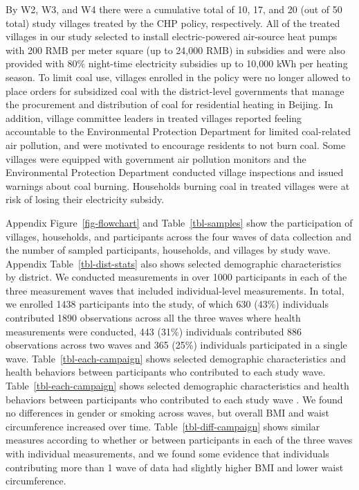 \documentclass[
  letterpaper,
  DIV=11,
  numbers=noendperiod]{scrartcl}
\begin{document}
By W2, W3, and W4 there were a cumulative total of 10, 17, and 20 (out
of 50 total) study villages treated by the CHP policy, respectively. All
of the treated villages in our study selected to install
electric-powered air-source heat pumps with 200 RMB per meter square (up
to 24,000 RMB) in subsidies and were also provided with 80\% night-time
electricity subsidies up to 10,000 kWh per heating season. To limit coal
use, villages enrolled in the policy were no longer allowed to place
orders for subsidized coal with the district-level governments that
manage the procurement and distribution of coal for residential heating
in Beijing. In addition, village committee leaders in treated villages
reported feeling accountable to the Environmental Protection Department
for limited coal-related air pollution, and were motivated to encourage
residents to not burn coal. Some villages were equipped with government
air pollution monitors and the Environmental Protection Department
conducted village inspections and issued warnings about coal burning.
Households burning coal in treated villages were at risk of losing their
electricity subsidy.

Appendix  Figure~\ref{fig-flowchart} and
Table~\ref{tbl-samples} show the participation of villages, households,
and participants across the four waves of data collection and the number
of sampled participants, households, and villages by study wave.
Appendix Table~\ref{tbl-dist-stats} also shows  selected
demographic characteristics by district. We conducted measurements in
over 1000 participants in each of the three measurement waves that
included individual-level measurements. In total, we enrolled
 1438 participants into the study, of which 630 (43\%)
individuals contributed 1890 observations across all the three waves
where health measurements were conducted, 443 (31\%) individuals
contributed 886 observations across two waves and 365 (25\%) individuals
participated in a single wave. Table~\ref{tbl-each-campaign} shows
selected demographic characteristics and health behaviors between
participants who contributed to each study wave.
Table~\ref{tbl-each-campaign} shows selected demographic characteristics
and health behaviors between participants who contributed to each study
wave . We found no differences in gender or smoking
across waves, but overall BMI and waist circumference increased over
time. Table~\ref{tbl-diff-campaign} shows similar
measures according to whether or between participants in each of the
three waves with individual measurements, and we found some evidence
that individuals contributing more than 1 wave of data had slightly
higher BMI and lower waist circumference.
\end{document}
